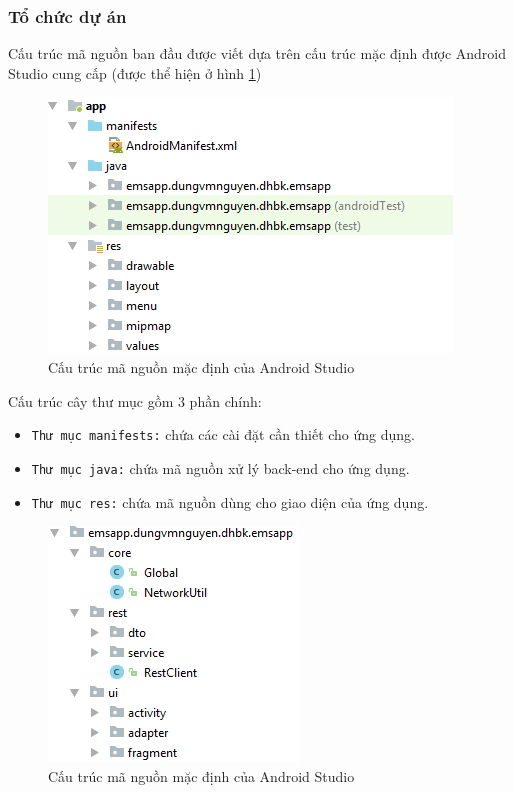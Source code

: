 \documentclass[a4paper]{article}
\begin{document}
\subsubsection{Tổ chức dự án}
Cấu trúc mã nguồn ban đầu được viết dựa trên cấu trúc mặc định được Android Studio cung cấp (được thể hiện ở hình \ref{fig:client_architecture})\\
\begin{figure}[!h]
    \includegraphics[scale=1]{Client/client-architecture}
    \centering
    \caption{Cấu trúc mã nguồn mặc định của Android Studio}
    \label{fig:client_architecture}
\end{figure}
\par
Cấu trúc cây thư mục gồm 3 phần chính:
\begin{itemize}
  \item \texttt{Thư mục manifests:} chứa các cài đặt cần thiết cho ứng dụng. 
  \item \texttt{Thư mục java:} chứa mã nguồn xử lý back-end cho ứng dụng.
  \item \texttt{Thư mục res:} chứa mã nguồn dùng cho giao diện của ứng dụng.
\end{itemize}
\begin{figure}[!h]
    \includegraphics[scale=1]{Client/project-architecture}
    \centering
    \caption{Cấu trúc mã nguồn mặc định của Android Studio}
    \label{fig:project_architecture}
\end{figure}
\end{document}
